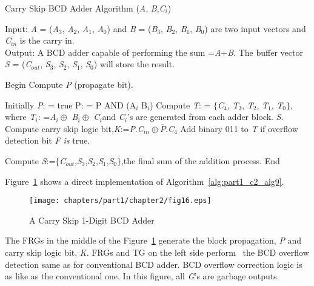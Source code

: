 \begin{algorithm}[!tbh]
\caption{Carry Skip BCD Adder Algorithm ({\it A}, {\it B},{\it C${}_{i}$})}
\label{alg:part1_c2_alg9}
Input: {\it A }= ({\it A}${}_{3}$, {\it A}${}_{2}$, {\it A}${}_{1}$, {\it A}${}_{0}$) and {\it B }= ({\it B}${}_{3}$, {\it B}${}_{2}$, {\it B}${}_{1}$, {\it B}${}_{0}$) are two input vectors and {\it C}${}_{in}$ is the carry in.\\
Output: A BCD adder capable of performing the sum ={\it A}+{\it B}. The buffer vector {\it S }= ({\it C}${}_{out}$, {\it S}${}_{3}$, {\it S}${}_{2}$, {\it S}${}_{1}$, {\it S}${}_{0}$) will store the result.
\begin{algorithmic}[1]
\STATE Begin
\STATE Compute {\it P }(propagate bit).

\STATE Initially {\it P}: = true
\STATE P: = P AND (A${}_{i}$ B${}_{i}$)
\ENDFOR
\STATE Compute {\it T}: = ${\{}${\it C}${}_{4}$, {\it T}${}_{3}$, {\it T}${}_{2}$, {\it T}${}_{1}$, {\it T}${}_{0}$${\}}$, where {\it T${}_{i}$}: ={\it A${}_{i}\oplus$} {\it B${}_{i}\oplus$} {\it C${}_{i}$}and {\it C${}_{i}$}'s are generated from each adder block.
 {\it S}.
\STATE Compute carry skip logic bit,{\it K}:={\it P}.{\it C}${}_{in}\oplus \overline{P}$.{\it C}${}_{4}$
\STATE Add binary 011 to {\it T }if overflow detection bit {\it F is} true.

\STATE Compute {\it S}:=${\{}${\it C}${}_{out}$,{\it S}${}_{3}$,{\it S}${}_{2}$,{\it S}${}_{1}$,{\it S}${}_{0}$${\}}$,the final sum of the addition process.
\STATE End
\end{algorithmic}
\end{algorithm}

\begin{example}\textnormal{
Figure~\ref{fig:p1_c2_fig16} shows a direct implementation of Algorithm~\ref{alg:part1_c2_alg9}.}
\end{example}

\begin{figure}[!tbh]
\centering
\texttt{[image: chapters/part1/chapter2/fig16.eps]}
\caption{A Carry Skip 1-Digit BCD Adder}
\label{fig:p1_c2_fig16}
\end{figure}

The FRGs in the middle of the Figure~\ref{fig:p1_c2_fig16} generate the block propagation, {\it P }and carry skip logic bit, {\it K}. FRGs and TG on the left side perform~ the BCD overflow detection same as for conventional BCD adder. BCD overflow correction logic is as like as the conventional one. In this figure, all {\it G}'s are garbage outputs.

